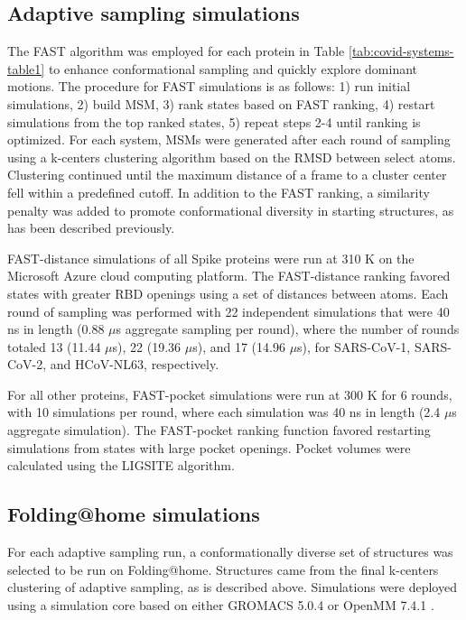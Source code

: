\documentclass[../main.tex]{subfiles}
\begin{document}
    \subsection{Adaptive sampling simulations}
        The FAST algorithm was employed for each protein in Table \ref{tab:covid-systems-table1} to enhance conformational sampling and quickly explore dominant motions. The procedure for FAST simulations is as follows: 1) run initial simulations, 2) build MSM, 3) rank states based on FAST ranking, 4) restart simulations from the top ranked states, 5) repeat steps 2-4 until ranking is optimized. For each system, MSMs were generated after each round of sampling using a k-centers clustering algorithm based on the RMSD between select atoms. Clustering continued until the maximum distance of a frame to a cluster center fell within a predefined cutoff. In addition to the FAST ranking, a similarity penalty was added to promote conformational diversity in starting structures, as has been described previously\cite{zimmerman_prediction_2017}.

        FAST-distance simulations of all Spike proteins were run at 310 K on the Microsoft Azure cloud computing platform. The FAST-distance ranking favored states with greater RBD openings using a set of distances between atoms. Each round of sampling was performed with 22 independent simulations that were 40 ns in length (0.88 $\mu$s aggregate sampling per round), where the number of rounds totaled 13 (11.44 $\mu$s), 22 (19.36 $\mu$s), and 17 (14.96 $\mu$s), for SARS-CoV-1, SARS-CoV-2, and HCoV-NL63, respectively.

        For all other proteins, FAST-pocket simulations were run at 300 K for 6 rounds, with 10 simulations per round, where each simulation was 40 ns in length (2.4 $\mu$s aggregate simulation). The FAST-pocket ranking function favored restarting simulations from states with large pocket openings. Pocket volumes were calculated using the LIGSITE algorithm\cite{hendlich_ligsite:_1997}.

    \subsection{Folding@home simulations}
        For each adaptive sampling run, a conformationally diverse set of structures was selected to be run on Folding@home. Structures came from the final k-centers clustering of adaptive sampling, as is described above. Simulations were deployed using a simulation core based on either GROMACS 5.0.4 or OpenMM 7.4.1 \cite{Abraham:2015gj,eastman_openmm_2017}.
\end{document}
